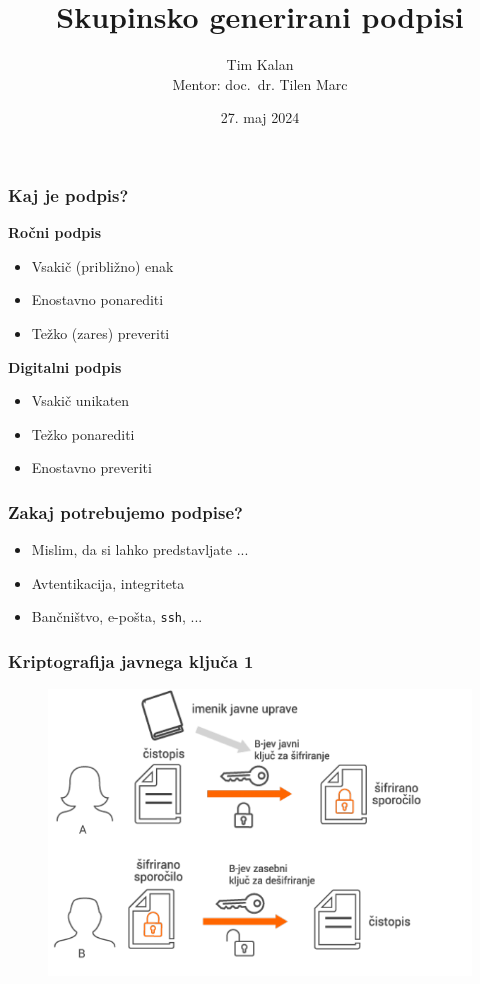 \documentclass{beamer}    %
\author{Tim Kalan \\ \medskip
        \footnotesize Mentor: doc.~dr. Tilen Marc}
\title{Skupinsko generirani podpisi}
\date{27. maj 2024}
\begin{document}
\begin{frame}
    \titlepage
\end{frame}

\begin{frame}
    \frametitle{Kaj je podpis?}
    \begin{multicols*}{2}
        \textbf{Ročni podpis}
        \begin{itemize}
            \item Vsakič (približno) enak
            \item Enostavno ponarediti
            \item Težko (zares) preveriti
        \end{itemize}
        \columnbreak

        \textbf{Digitalni podpis}
        \begin{itemize}
            \item Vsakič unikaten
            \item Težko ponarediti
            \item Enostavno preveriti
        \end{itemize}
    \end{multicols*}
\end{frame}

\begin{frame}
    \frametitle{Zakaj potrebujemo podpise?}
    \begin{itemize}
        \item Mislim, da si lahko predstavljate ... 
        \item Avtentikacija, integriteta
        \item Bančništvo, e-pošta, \texttt{ssh}, ...
    \end{itemize}
\end{frame}

\begin{frame}
    \frametitle{Kriptografija javnega ključa 1}
    \begin{figure}
        \includegraphics[width=\textwidth]{images/enkripcija.png}
    \end{figure}
\end{frame}
\end{document}

